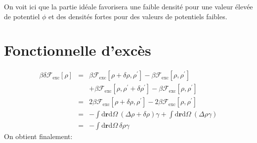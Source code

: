 On voit ici que la partie idéale favorisera une faible densité pour une valeur élevée de potentiel $\phi$ et des densités fortes pour des valeurs de potentiels faibles.

\section{Fonctionnelle d'excès}
\label{sec:annexes:grad:exc}
\begin{eqnarray}
\beta \delta \mathcal{F}_\mathrm{exc}[\rho] &=& \beta \mathcal{F}_\mathrm{exc}[\rho + \delta \rho, \rho^\prime] -\beta \mathcal{F}_\mathrm{exc}[\rho, \rho^\prime] \\
& & + \beta \mathcal{F}_\mathrm{exc}[\rho, \rho^\prime + \delta \rho^\prime] -\beta \mathcal{F}_\mathrm{exc}[\rho, \rho^\prime] \nonumber\\
&=& 2 \beta \mathcal{F}_\mathrm{exc}[\rho + \delta \rho, \rho^\prime] - 2 \beta \mathcal{F}_\mathrm{exc}[\rho, \rho^\prime] \\
&=& -\int\mathrm{d}\boldsymbol{r}\mathrm{d}\Omega\ (\Delta\rho+\delta\rho) \gamma  + \int\mathrm{d}\boldsymbol{r}\mathrm{d}\Omega\ (\Delta\rho \gamma) \\
&=& -\int\mathrm{d}\boldsymbol{r}\mathrm{d}\Omega\ \delta\rho \gamma
\end{eqnarray}
On obtient finalement:

